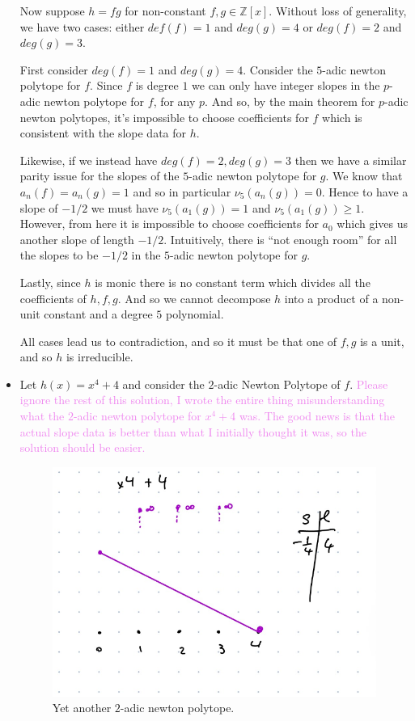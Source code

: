 \documentclass[12pt,letterpaper,boxed]{hmcpset}
\newcommand{\wg}[1]{\textcolor{violet}{#1}}
\newcommand{\Z}{\mathbb Z}
\begin{document}
\begin{solution}
\begin{itemize}
Now suppose $h = fg$ for non-constant $f,g \in \Z[x]$.
Without loss of generality, we have two cases: either $def(f) = 1$ and $deg(g) = 4$ or $deg(f) =
2$ and $deg(g) = 3$.

First consider $deg(f) = 1$ and $deg(g) = 4$. Consider the $5$-adic
newton polytope for $f$. Since $f$ is degree $1$ we can only have
integer slopes in the $p$-adic newton polytope for $f$, for any $p$. 
And so, by the main theorem for $p$-adic newton polytopes, it's
impossible to choose coefficients for $f$ which is consistent with the
slope data for $h$.

Likewise, if we instead have $deg(f) = 2, deg(g) = 3$ then we have a
similar parity issue for the slopes of the $5$-adic newton polytope
for $g$. We know that $a_n(f) = a_n(g) = 1$ and so in particular
$\nu_5(a_n(g)) = 0$. Hence to have a slope of $-1/2$ we must have
$\nu_5(a_1(g)) = 1$ and $\nu_5(a_1(g)) \geq 1$. However, from here it
is impossible to choose coefficients for $a_0$ which gives us another
slope of length $-1/2$. Intuitively, there is ``not enough room''
for all the slopes to be $-1/2$ in the $5$-adic newton polytope for
$g$.

Lastly, since $h$ is monic there is no constant term which divides all
the coefficients of $h,f,g$. And so we cannot decompose $h$ into a
product of a non-unit constant and a degree $5$ polynomial.

All cases lead us to contradiction, and so it must be that one of
$f,g$ is a unit, and so $h$ is irreducible. 


\item Let $h(x) = x^4 + 4$ and consider the $2$-adic Newton Polytope
of $f$. 
\wg{Please ignore the rest of this solution, I wrote the entire thing
misunderstanding what the $2$-adic newton polytope for $x^4 + 4$ was.
The good news is that the actual slope data is better than what I
initially thought it was, so the solution should be easier.}
\begin{figure}[h]
	\centering
	\includegraphics[scale=0.5]{newt_d.png}	
	\caption{Yet another $2$-adic newton polytope.}
\end{figure}



\end{itemize}
\end{solution}
\end{document}
